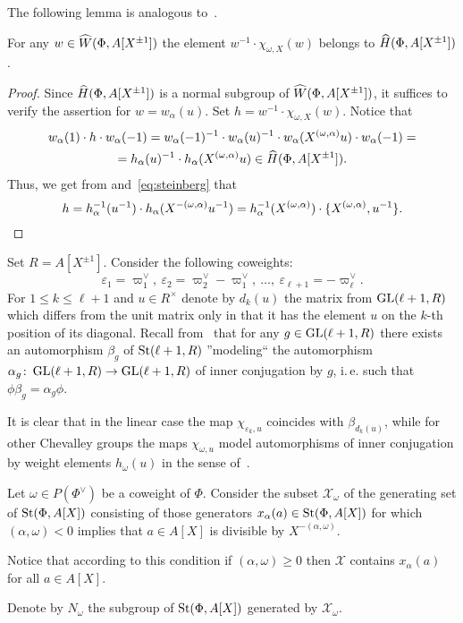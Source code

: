The following lemma is analogous to~\cite[Lemma~3.1(c)]{Tu83}.
\begin{lemma} \label{lem:winv-chiw}
For any $w \in \widehat{W}(\Phi, A[X^{\pm 1}])$ the element $w^{-1} \cdot \chi_{\omega, X}(w)$ belongs to $\widehat{H}(\Phi, A[X^{\pm 1}])$.
\end{lemma}
\begin{proof}
    Since $\widehat{H}(\Phi, A[X^{\pm 1}])$ is a normal subgroup of $\widehat{W}(\Phi, A[X^{\pm 1}])$, it suffices to verify the assertion for $w = w_\alpha(u)$.
    Set $h = w^{-1} \cdot \chi_{\omega, X}(w)$.
    Notice that
    \begin{multline*} w_\alpha(1) \cdot h\cdot  w_\alpha(-1) = w_\alpha(-1)^{-1} \cdot w_\alpha(u)^{-1} \cdot w_{\alpha}(X^{(\omega, \alpha)} u) \cdot w_\alpha(-1) = \\
    = h_\alpha(u)^{-1} \cdot h_\alpha(X^{(\omega, \alpha)}u) \in \widehat{H}(\Phi, A[X^{\pm 1}]).\end{multline*}
    Thus, we get from\cite[Lemme~5.2(b,g)]{Ma69} and~\eqref{eq:steinberg} that \[h = h_{\alpha}^{-1}(u^{-1}) \cdot h_{\alpha}(X^{-(\omega, \alpha)}u^{-1}) = h_{\alpha}^{-1}(X^{(\omega, \alpha)}) \cdot \{ X^{(\omega, \alpha)}, u^{-1} \}. \qedhere\]
\end{proof}

\begin{example} \label{exm:chi-linear}
Set $R = A[X^{\pm 1}]$.
Consider the following coweights:
\[\varepsilon_1 = \varpi_1^\vee,\ \varepsilon_2 = \varpi_2^\vee - \varpi_1^\vee,\ \ldots,\ \varepsilon_{\ell+1} = -\varpi^\vee_\ell.\]
For $1\leq k\leq \ell+1$ and $u \in R^\times$ denote by $d_k(u)$ the matrix from $\operatorname{GL}(\ell+1, R)$ which differs from the unit matrix only in that it has the element $u$ on the $k$-th position of its diagonal.
Recall from~\cite[Corollary~4]{Ka77} that for any $g \in \operatorname{GL}(\ell+1, R)$ there exists an automorphism $\beta_g$ of $\operatorname{St}(\ell+1, R)$ ''modeling`` the automorphism $\alpha_g \colon \operatorname{GL}(\ell+1, R) \to \operatorname{GL}(\ell+1, R)$ of inner conjugation by $g$, i.\,e. such that $\phi \beta_g = \alpha_g \phi$.


It is clear that in the linear case the map $\chi_{\varepsilon_k, u}$ coincides with $\beta_{d_k(u)}$,
while for other Chevalley groups the maps $\chi_{\omega, u}$ model automorphisms of inner conjugation by weight elements $h_\omega(u)$ in the sense of~\cite[\S~4]{Vav09}.
\end{example}


Let $\omega \in P(\Phi^\vee)$ be a coweight of $\Phi$.
Consider the subset $\mathcal{X}_\omega$ of the generating set of $\operatorname{St}(\Phi, A[X])$ consisting of those generators $x_{\alpha}(a) \in \operatorname{St}(\Phi, A[X])$ for which
$(\alpha, \omega) < 0$ implies that $a \in A[X]$ is divisible by $X^{-(\alpha, \omega)}$.
\begin{rem}
    Notice that according to this condition if $(\alpha, \omega) \geq 0$ then $\mathcal{X}$ contains $x_\alpha(a)$ for all $a \in A[X]$.
\end{rem}
Denote by $N_\omega$ the subgroup of $\operatorname{St}(\Phi, A[X])$ generated by $\mathcal{X}_\omega$.



